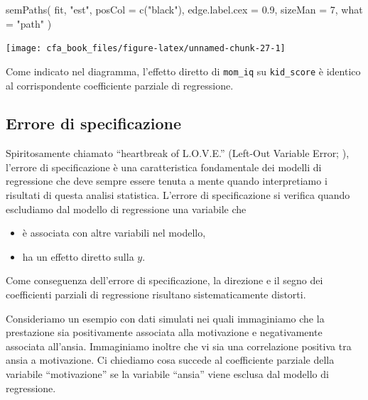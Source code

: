 \documentclass[
  11pt,
]{krantz}
\makeatletter
\newenvironment{Shaded}{\begin{snugshade}}{\end{snugshade}}
\newcommand{\AttributeTok}[1]{\textcolor[rgb]{0.61,0.61,0.61}{#1}}
\newcommand{\DecValTok}[1]{\textcolor[rgb]{0.06,0.06,0.06}{#1}}
\newcommand{\FloatTok}[1]{\textcolor[rgb]{0.06,0.06,0.06}{#1}}
\newcommand{\FunctionTok}[1]{\textcolor[rgb]{0,0,0}{#1}}
\newcommand{\NormalTok}[1]{#1}
\newcommand{\StringTok}[1]{\textcolor[rgb]{0.5,0.5,0.5}{#1}}
\providecommand{\tightlist}{%
  \setlength{\itemsep}{0pt}\setlength{\parskip}{0pt}}
\newenvironment{kframe}{%
\medskip{}
\setlength{\fboxsep}{.8em}
 \def\at@end@of@kframe{}%
 \ifinner\ifhmode%
  \def\at@end@of@kframe{\end{minipage}}%
  \begin{minipage}{\columnwidth}%
 \fi\fi%
 \def\FrameCommand##1{\hskip\@totalleftmargin \hskip-\fboxsep
 \colorbox{shadecolor}{##1}\hskip-\fboxsep
     \hskip-\linewidth \hskip-\@totalleftmargin \hskip\columnwidth}%
 \MakeFramed {\advance\hsize-\width
   \@totalleftmargin\z@ \linewidth\hsize
   \@setminipage}}%
 {\par\unskip\endMakeFramed%
 \at@end@of@kframe}
\renewenvironment{Shaded}{\begin{kframe}}{\end{kframe}}
\theoremstyle{definition}
\theoremstyle{definition}
\theoremstyle{definition}
\theoremstyle{definition}
\theoremstyle{remark}
\makeatother
\begin{document}
\begin{Shaded}
\begin{Highlighting}[]
\FunctionTok{semPaths}\NormalTok{(}
\NormalTok{  fit, }\StringTok{"est"}\NormalTok{,}
  \AttributeTok{posCol =} \FunctionTok{c}\NormalTok{(}\StringTok{"black"}\NormalTok{),}
  \AttributeTok{edge.label.cex =} \FloatTok{0.9}\NormalTok{,}
  \AttributeTok{sizeMan =} \DecValTok{7}\NormalTok{,}
  \AttributeTok{what =} \StringTok{"path"}
\NormalTok{)}
\end{Highlighting}
\end{Shaded}

\begin{center}\texttt{[image: cfa\_book\_files/figure-latex/unnamed-chunk-27-1]} \end{center}

Come indicato nel diagramma, l'effetto diretto di \texttt{mom\_iq} su \texttt{kid\_score} è identico al corrispondente coefficiente parziale di regressione.

\hypertarget{errore-di-specificazione}{%
\subsection{Errore di specificazione}\label{errore-di-specificazione}}

Spiritosamente chiamato ``heartbreak of L.O.V.E.'' (Left-Out Variable Error; \citet{mauro1990understanding}), l'errore di specificazione è una caratteristica fondamentale dei modelli di regressione che deve sempre essere tenuta a mente quando interpretiamo i risultati di questa analisi statistica. L'errore di specificazione si verifica quando escludiamo dal modello di regressione una variabile che

\begin{itemize}
\tightlist
\item
  è associata con altre variabili nel modello,
\item
  ha un effetto diretto sulla \(y\).
\end{itemize}

Come conseguenza dell'errore di specificazione, la direzione e il segno dei coefficienti parziali di regressione risultano sistematicamente distorti.

Consideriamo un esempio con dati simulati nei quali immaginiamo che la prestazione sia positivamente associata alla motivazione e negativamente associata all'ansia. Immaginiamo inoltre che vi sia una correlazione positiva tra ansia a motivazione. Ci chiediamo cosa succede al coefficiente parziale della variabile ``motivazione'' se la variabile ``ansia'' viene esclusa dal modello di regressione.
\end{document}
